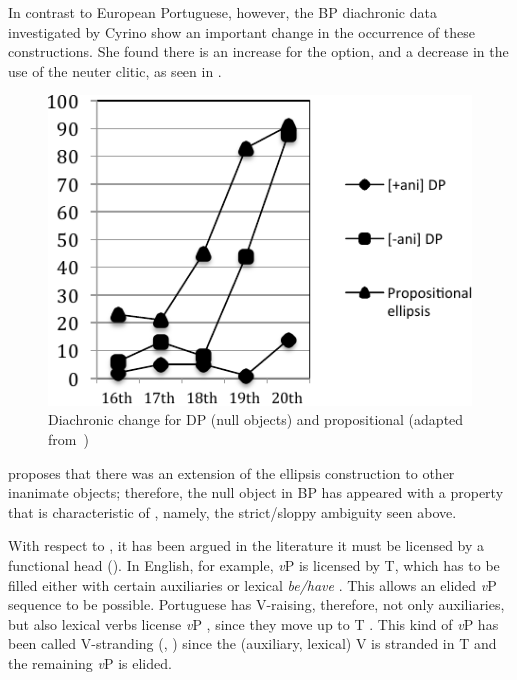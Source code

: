 \documentclass[output=paper]{langsci/langscibook}
\begin{document}
In contrast to European Portuguese, however, the \gls{BP} diachronic data
investigated by Cyrino show an important change in the occurrence of these
constructions. She found there is an increase for the  option, and a
decrease in the use of the neuter clitic, as seen in .

\begin{figure}[htpb]
    \centering
    \includegraphics[width=.75\linewidth]{./img/fig27-1.pdf}
    \caption{Diachronic change for DP  (null objects) and propositional
     (adapted from~\citealt{Cyrino1994,Cyrino1997})}
    \label{fig:key:27.1}
\end{figure}

\citet{Cyrino1994,Cyrino1997} proposes that there was an extension of the
ellipsis construction to other inanimate objects; therefore, the null object in
BP has appeared with a property that is characteristic of , namely, the
strict/sloppy ambiguity seen above.

With respect to , it has been argued in the literature it must be
licensed by a functional head
(\citealt{Lobeck1995,Kester1996}). In English, for example, \emph{v}P
 is licensed by T, which has to be filled either with certain
auxiliaries or lexical \emph{be/have} \citep{Lobeck1995}. This allows an elided
\emph{v}P sequence to be possible.  Portuguese has V-raising, therefore, not
only auxiliaries, but also lexical verbs license \emph{v}P ,
since they move up to T \parencite{Matos1992,CyrinoMatos2002}. This kind of
\emph{v}P  has been called V-stranding 
(\citealt{Santos2009}, \citealt{Goldberg2005}) since the (auxiliary, lexical) V
is stranded in T and the remaining \emph{v}P is elided.
\end{document}
